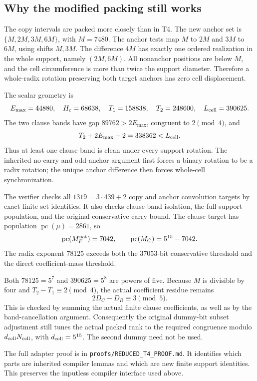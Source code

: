 \documentclass[11pt]{article}
\theoremstyle{remark}\newtheorem{remark}[theorem]{Remark}
\newcommand{\pc}{\operatorname{pc}}
\begin{document}
\subsection{Why the modified packing still works}

The copy intervals are packed more closely than in T4. The new anchor
set is \(\{M,2M,3M,6M\}\), with \(M=7480\).
The anchor tests map \(M\) to \(2M\) and \(3M\) to \(6M\),
using shifts \(M,3M\). The difference \(4M\) has exactly one
ordered realization in the whole support, namely \((2M,6M)\).
All nonanchor positions are below \(M\), and the cell circumference
is more than twice the support diameter. Therefore a whole-radix
rotation preserving both target anchors has zero cell displacement.

The scalar geometry is
\[
 E_{\max}=44880,\quad H_c=68638,\quad
 T_1=158838,\quad T_2=248600,\quad L_{\rm cell}=390625.
\]
The two clause bands have gap \(89762>2E_{\max}\), congruent to
\(2\pmod4\), and
\[
 T_2+2E_{\max}+2=338362<L_{\rm cell}.
\]
Thus at least one clause band is clean under every support rotation.
The inherited no-carry and odd-anchor argument first forces a binary
rotation to be a radix rotation; the unique anchor difference then
forces whole-cell synchronization.

The verifier checks all \(1319=3\cdot439+2\) copy and anchor
convolution targets by exact finite set identities. It also checks
clause-band isolation, the full support population, and the original
conservative carry bound. The clause target has population
\(\pc(\mu)=2861\), so
\[
 \pc(M_F^{\rm nat})=7042,\qquad
 \pc(M_C)=5^{15}-7042.
\]
The radix exponent \(78125\) exceeds both the \(37053\)-bit
conservative threshold and the direct coefficient-mass threshold.

Both \(78125=5^7\) and \(390625=5^8\) are powers of five.
Because \(M\) is divisible by four and \(T_2-T_1\equiv2\pmod4\),
the actual coefficient residue remains
\[
 2D_C-D_R\equiv3\pmod5.
\]
This is checked by summing the actual finite clause coefficients,
as well as by the band-cancellation argument.
Consequently the original dummy-bit subset adjustment still tunes
the actual packed rank to the required congruence modulo
\(d_{\rm cell}N_{\rm cell}\), with \(d_{\rm cell}=5^{15}\).
The second dummy need not be used.

The full adapter proof is in
\texttt{proofs/REDUCED\_T4\_PROOF.md}. It identifies which parts are
inherited compiler lemmas and which are new finite support identities.
This preserves the inputless compiler interface used above.
\end{document}
